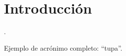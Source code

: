 \chapter{Introducción}
\label{introduccion}

\par \lipsum[2-5].\\

\par Ejemplo de acrónimo completo: \enquote{\acrfull{tupa}}.\\